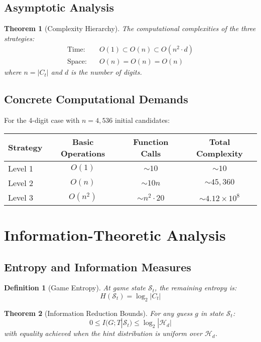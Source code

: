 \documentclass{article}
\newtheorem{definition}{Definition}
\newtheorem{theorem}{Theorem}
\begin{document}
\subsection{Asymptotic Analysis}

\begin{theorem}[Complexity Hierarchy]
The computational complexities of the three strategies:
\begin{align}
\text{Time:} \quad &O(1) \subset O(n) \subset O(n^2 \cdot d) \\
\text{Space:} \quad &O(n) = O(n) = O(n)
\end{align}
where $n = |C_t|$ and $d$ is the number of digits.
\end{theorem}

\subsection{Concrete Computational Demands}

For the 4-digit case with $n = 4,536$ initial candidates:

\begin{center}
\begin{tabular}{lccc}
\toprule
Strategy & Basic Operations & Function Calls & Total Complexity \\
\midrule
Level 1 & $O(1)$ & $\sim 10$ & $\sim 10$ \\
Level 2 & $O(n)$ & $\sim 10n$ & $\sim 45,360$ \\
Level 3 & $O(n^2)$ & $\sim n^2 \cdot 20$ & $\sim 4.12 \times 10^8$ \\
\bottomrule
\end{tabular}
\end{center}


\section{Information-Theoretic Analysis}

\subsection{Entropy and Information Measures}

\begin{definition}[Game Entropy]
At game state $\mathcal{S}_t$, the remaining entropy is:
$$H(\mathcal{S}_t) = \log_2 |C_t|$$
\end{definition}

\begin{theorem}[Information Reduction Bounds]
For any guess $g$ in state $\mathcal{S}_t$:
$$0 \leq I(G; T | \mathcal{S}_t) \leq \log_2 |\mathcal{H}_d|$$
with equality achieved when the hint distribution is uniform over $\mathcal{H}_d$.
\end{theorem}
\end{document}
